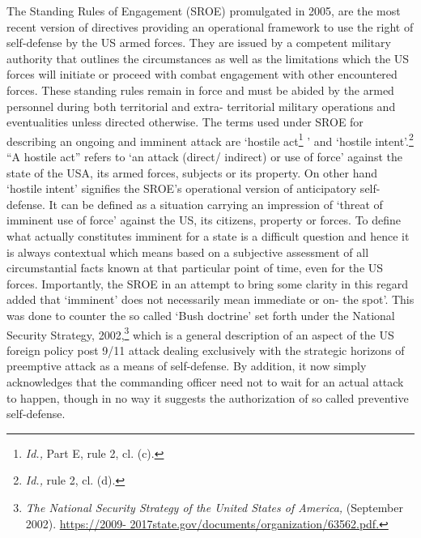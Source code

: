 \begin{multicols}{2}

\noi
The Standing Rules of Engagement (SROE) promulgated in 2005, are the most recent
version of directives providing an operational framework to use the right of self-defense by
the US armed forces. They are issued by a competent military authority that outlines the
circumstances as well as the limitations which the US forces will initiate or proceed with
combat engagement with other encountered forces. These standing rules remain in force
and must be abided by the armed personnel during both territorial and extra- territorial
military operations and eventualities unless directed otherwise. The terms used under SROE
for describing an ongoing and imminent attack are ‘hostile act\footnote{\textit{Id.,} Part E, rule 2, cl. (c).}
’ and ‘hostile intent’.\footnote{\textit{Id.,} rule 2, cl. (d).} “A hostile act” refers to ‘an attack (direct/ indirect) or use of force’ against the state of the USA, its armed forces, subjects or its property. On other hand ‘hostile intent’ signifies the
SROE’s operational version of anticipatory self- defense. It can be defined as a situation
carrying an impression of ‘threat of imminent use of force’ against the US, its citizens,
property or forces. To define what actually constitutes imminent for a state is a difficult
question and hence it is always contextual which means based on a subjective assessment of
all circumstantial facts known at that particular point of time, even for the US forces.
Importantly, the SROE in an attempt to bring some clarity in this regard added that
‘imminent’ does not necessarily mean immediate or on- the spot’. This was done to counter
the so called ‘Bush doctrine’ set forth under the National Security Strategy, 2002,\footnote{\textit{The National Security Strategy of the United States of America,} (September 2002). \url{https://2009-
2017state.gov/documents/organization/63562.pdf.}} which
is a general description of an aspect of the US foreign policy post 9/11 attack dealing
exclusively with the strategic horizons of preemptive attack as a means of self-defense.
By addition, it now simply acknowledges that the commanding officer need not to wait for
an actual attack to happen, though in no way it suggests the authorization of so called preventive self-defense.


\end{multicols}
